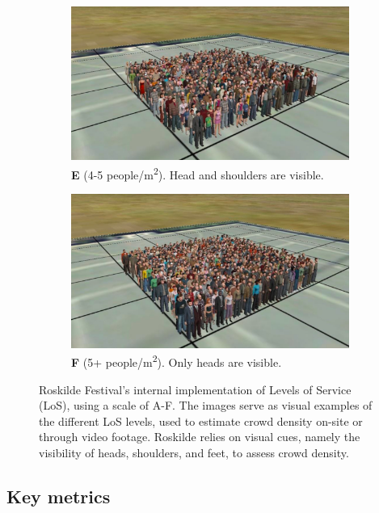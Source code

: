 \begin{figure}
  \begin{subfigure}[t]{0.45\textwidth}
    \centering
    \includegraphics[width=\textwidth]{Pictures/Figures/Los/E.png}
    \caption*{\textbf{E} (4-5 people/m\textsuperscript{2}). Head and shoulders are visible.}
  \end{subfigure}%
  \hspace{0.06\textwidth}
  \begin{subfigure}[t]{0.45\textwidth}
    \centering
    \includegraphics[width=\textwidth]{Pictures/Figures/Los/F.png}
    \caption*{\textbf{F} (5+ people/m\textsuperscript{2}). Only heads are visible.}
  \end{subfigure}
  \caption{Roskilde Festival's internal implementation of Levels of Service (LoS), using a scale of A-F. The images serve as visual examples of the different LoS levels, used to estimate crowd density on-site or through video footage. Roskilde relies on visual cues, namely the visibility of heads, shoulders, and feet, to assess crowd density.}
  \label{fig:fruin}
\end{figure}

\subsection{Key metrics}
\label{sec:key-metrics}



